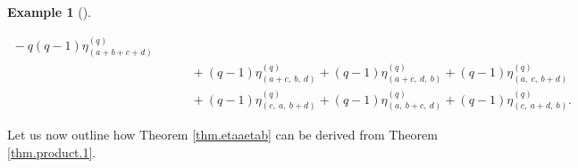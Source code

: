 \documentclass[numbers=enddot,12pt,final,onecolumn,notitlepage]{scrartcl}%
\theoremstyle{definition}
\newtheorem{exam}[theo]{Example}
\newenvironment{example}[1][]
{\begin{exam}[#1]\begin{leftbar}}
{\end{leftbar}\end{exam}}
\begin{document}
\begin{example}
\begin{align*}
{}-q\left(  q-1\right)  \eta_{\left(  a+b+c+d\right)  }^{\left(  q\right)  }\\
&  \ \ \ \ \ \ \ \ \ \ +\left(  q-1\right)  \eta_{\left(  a+c,\ b,\ d\right)
}^{\left(  q\right)  }+\left(  q-1\right)  \eta_{\left(  a+c,\ d,\ b\right)
}^{\left(  q\right)  }+\left(  q-1\right)  \eta_{\left(  a,\ c,\ b+d\right)
}^{\left(  q\right)  }\\
&  \ \ \ \ \ \ \ \ \ \ +\left(  q-1\right)  \eta_{\left(  c,\ a,\ b+d\right)
}^{\left(  q\right)  }+\left(  q-1\right)  \eta_{\left(  a,\ b+c,\ d\right)
}^{\left(  q\right)  }+\left(  q-1\right)  \eta_{\left(  c,\ a+d,\ b\right)
}^{\left(  q\right)  }.
\end{align*}

\end{example}

Let us now outline how Theorem \ref{thm.etaaetab} can be derived from Theorem
\ref{thm.product.1}.
\end{document}
